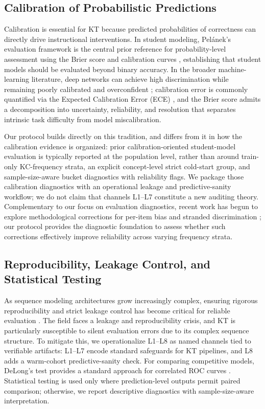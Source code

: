 \subsection{Calibration of Probabilistic Predictions}
Calibration is essential for KT because predicted probabilities of correctness can directly drive instructional interventions. In student modeling, Pel\'{a}nek's evaluation framework is the central prior reference for probability-level assessment using the Brier score and calibration curves \citep{pelanek2015metrics}, establishing that student models should be evaluated beyond binary accuracy. In the broader machine-learning literature, deep networks can achieve high discrimination while remaining poorly calibrated and overconfident \citep{guo2017calibration}; calibration error is commonly quantified via the Expected Calibration Error (ECE) \citep{naeini2015obtaining}, and the Brier score \citep{brier1950verification} admits a decomposition into uncertainty, reliability, and resolution \citep{degroot1983comparison} that separates intrinsic task difficulty from model miscalibration.

Our protocol builds directly on this tradition, and differs from it in how the calibration evidence is organized: prior calibration-oriented student-model evaluation is typically reported at the population level, rather than around train-only KC-frequency strata, an explicit concept-level strict cold-start group, and sample-size-aware bucket diagnostics with reliability flags. We package those calibration diagnostics with an operational leakage and predictive-sanity workflow; we do not claim that channels L1--L7 constitute a new auditing theory. Complementary to our focus on evaluation diagnostics, recent work has begun to explore methodological corrections for per-item bias and stranded discrimination \citep{yan2026recovering}; our protocol provides the diagnostic foundation to assess whether such corrections effectively improve reliability across varying frequency strata.

\subsection{Reproducibility, Leakage Control, and Statistical Testing}
As sequence modeling architectures grow increasingly complex, ensuring rigorous reproducibility and strict leakage control has become critical for reliable evaluation \citep{kapoor2023leakage, gervet2020deep, kim2026ensuring}. The field faces a leakage and reproducibility crisis, and KT is particularly susceptible to silent evaluation errors due to its complex sequence structure. To mitigate this, we operationalize L1--L8 as named channels tied to verifiable artifacts: L1--L7 encode standard safeguards for KT pipelines, and L8 adds a warm-cohort predictive-sanity check. For comparing competitive models, DeLong's test provides a standard approach for correlated ROC curves \citep{delong1988comparing}. Statistical testing is used only where prediction-level outputs permit paired comparison; otherwise, we report descriptive diagnostics with sample-size-aware interpretation.
